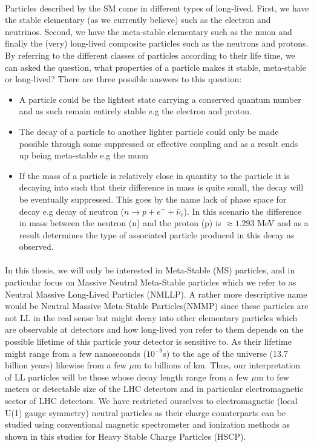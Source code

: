 \paragraph*{}
Particles described by the SM come in different types of long-lived.  First, we have the stable elementary (as we currently believe) such as the electron and neutrinos. Second, we have the meta-stable elementary such as the muon and finally the (very) long-lived composite particles such as the neutrons and protons. By referring to the different classes of particles according to their life time, we can asked the question, what properties of a particle makes it stable, meta-stable or long-lived?
\newline
There are three possible answers to this question:
\begin {itemize}
\item A particle could be the lightest state carrying a conserved quantum number and as such remain entirely stable e.g the electron and proton.
\item The decay of a particle to another lighter particle could only be  made possible through some suppressed or effective coupling and as a result ends up being meta-stable e.g the muon
\item If the mass of a particle is relatively close in quantity to the particle it is decaying into such that their difference in mass is quite small, the decay will be eventually suppressed. This goes by the name lack of phase space for decay e.g decay of neutron ($ n \rightarrow p + e^{-} + \bar{\nu}_{e} $). In this scenario the difference in mass between the neutron (n) and the proton (p) is $\approx 1.293$ MeV and as a result determines the type of associated particle produced in this decay as observed.
\end{itemize}

\paragraph*{}
In this thesis, we will only be  interested in Meta-Stable (MS) particles, and in particular focus on Massive Neutral Meta-Stable
particles which we refer to as Neutral Massive Long-Lived Particles (NMLLP). A rather more descriptive name would be Neutral Massive Meta-Stable Particles(NMMP) since these particles are not  LL in the real sense but might decay into other elementary particles which are observable at detectors and how long-lived you refer to them depends on the possible lifetime of this particle your detector is sensitive to. As their lifetime might range from a few nanoseconds ($10^{-9}$s) to the age of the universe (13.7 billion years) likewise from a few  $\mu$m to billions of km.
Thus, our interpretation of LL particles will be those whose decay length range from a few $\mu$m to few meters or detectable size of the LHC detectors and in particular electromagnetic sector of LHC detectors.
\newline
We have restricted ourselves to electromagnetic (local U(1) gauge symmetry) neutral particles as their charge counterparts can be studied using conventional magnetic spectrometer and ionization methods as shown in this studies for Heavy Stable Charge Particles (HSCP).



